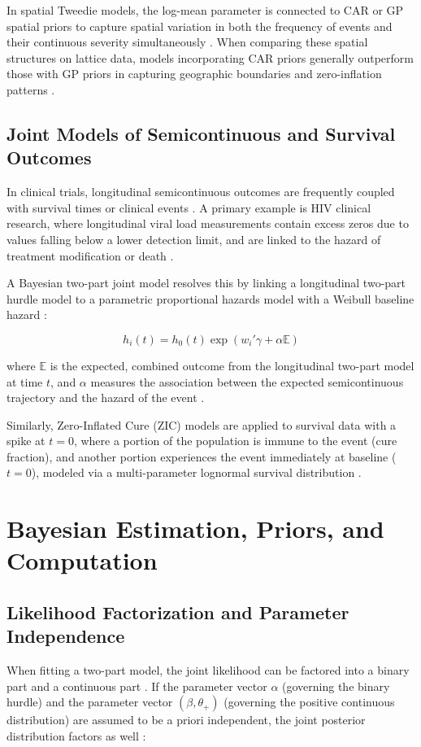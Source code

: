 \documentclass[11pt, a4paper]{article}
\begin{document}
In spatial Tweedie models, the log-mean parameter is connected to CAR or GP spatial priors to capture spatial variation in both the frequency of events and their continuous severity simultaneously \cite{ref29}. When comparing these spatial structures on lattice data, models incorporating CAR priors generally outperform those with GP priors in capturing geographic boundaries and zero-inflation patterns \cite{ref29}.

\subsection{Joint Models of Semicontinuous and Survival Outcomes}
In clinical trials, longitudinal semicontinuous outcomes are frequently coupled with survival times or clinical events \cite{ref16, ref32}. A primary example is HIV clinical research, where longitudinal viral load measurements contain excess zeros due to values falling below a lower detection limit, and are linked to the hazard of treatment modification or death \cite{ref32}.

A Bayesian two-part joint model resolves this by linking a longitudinal two-part hurdle model to a parametric proportional hazards model with a Weibull baseline hazard \cite{ref32}:

\begin{equation}
h_i(t) = h_0(t) \exp\left( w_i' \gamma + \alpha \mathbb{E} \right)
\end{equation}

where $\mathbb{E}$ is the expected, combined outcome from the longitudinal two-part model at time $t$, and $\alpha$ measures the association between the expected semicontinuous trajectory and the hazard of the event \cite{ref32}.

Similarly, Zero-Inflated Cure (ZIC) models are applied to survival data with a spike at $t = 0$, where a portion of the population is immune to the event (cure fraction), and another portion experiences the event immediately at baseline ($t = 0$), modeled via a multi-parameter lognormal survival distribution \cite{ref33}.

\section{Bayesian Estimation, Priors, and Computation}

\subsection{Likelihood Factorization and Parameter Independence}
When fitting a two-part model, the joint likelihood can be factored into a binary part and a continuous part \cite{ref34, ref35}. If the parameter vector $\alpha$ (governing the binary hurdle) and the parameter vector $(\beta, \theta_+)$ (governing the positive continuous distribution) are assumed to be a priori independent, the joint posterior distribution factors as well \cite{ref34, ref35}:
\end{document}
